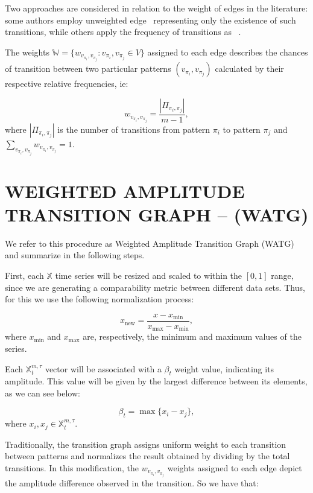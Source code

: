 \documentclass{isprs}
\begin{document}
	Two approaches are considered in relation to the weight of edges in the literature: some authors employ unweighted edge~\citep{McCullough2015lagged, Kulp2016ordinal} representing only the existence of such transitions, while others apply the frequency of transitions as ~\citep{Sorrentino2015periodic, Zhang2017ConstructingOP}.
	
	The weights $\mathbb{W} = \{w_{v_{\pi_i}, v_{\pi_j}}: v_{\pi_i}, v_{\pi_j} \in V \}$ assigned to each edge describes the chances of transition between two particular patterns $(v_{\pi_i}, v_{\pi_j})$ calculated by their respective relative frequencies, ie:	
	
	\begin{equation}
	w_{v_{\pi_i}, v_{\pi_j}} = \frac{|\Pi_{\pi_i,\pi_j}|}{m-1},
	\end{equation}
	where $|\Pi_{\pi_i,\pi_j}|$ is the number of transitions from pattern $\pi_i$ to pattern $\pi_j$ and $\sum_{v_{\pi_i}, v_{\pi_j}}w_{v_{\pi_i}, v_{\pi_j}} = 1$.
	
	\section{WEIGHTED AMPLITUDE TRANSITION GRAPH -- (WATG)}\label{WATG}
	
	We refer to this procedure as Weighted Amplitude Transition Graph (WATG) and summarize in the following steps.
	
	First, each $\mathbb{X}$ time series will be resized and scaled to within the $[0, 1]$ range, since we are generating a comparability metric between different data sets.
	Thus, for this we use the following normalization process:
	
	\begin{equation}
	x_{\text{new}} = \frac{x - x_{\min}}{x_{\max} - x_{\min}},
	\end{equation}
	where $x_{\min}$ and $x_{\max}$ are, respectively, the minimum and maximum values of the series.
	
	Each $\mathbb{X}^{m, \tau}_t$ vector will be associated with a $\beta_t$ weight value, indicating its amplitude.
	This value will be given by the largest difference between its elements, as we can see below:
	
	\begin{equation}
	\beta_t = \max\{x_i - x_j\},
	\end{equation}
	where $x_i, x_j \in \mathbb{X}^{m, \tau}_t$.
	
	Traditionally, the transition graph assigns uniform weight to each transition between patterns and normalizes the result obtained by dividing by the total transitions.
	In this modification, the $w_{v_{\pi_i}, v_{\pi_j}}$ weights assigned to each edge depict the amplitude difference observed in the transition.
	So we have that:	
	
\end{document}
